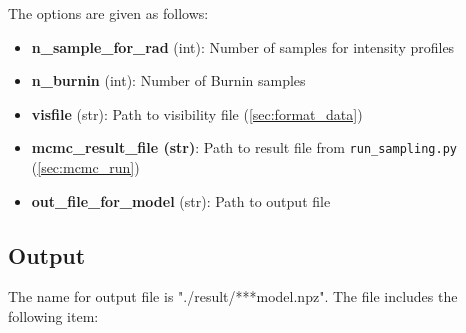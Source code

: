 \documentclass{report}
\begin{document}
The options are given as follows: 

\begin{itemize}
    \item \textbf{n\_sample\_for\_rad} (int): Number of samples for intensity profiles
    \item \textbf{n\_burnin} (int): Number of Burnin samples
    \item \textbf{visfile} (str): Path to visibility file (\ref{sec:format_data})
    \item \textbf{mcmc\_result\_file (str)}: Path to result file from \texttt{run\_sampling.py} (\ref{sec:mcmc_run})
    \item \textbf{out\_file\_for\_model} (str): Path to output file 
\end{itemize}


\subsection{Output}
The name for output file is "./result/***model.npz". The file includes the following item: 
\end{document}
